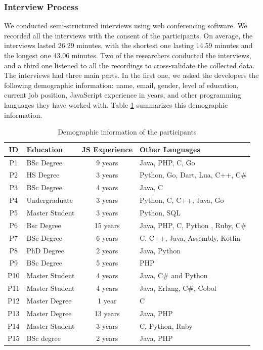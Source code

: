 \subsubsection*{Interview Process} We conducted semi-structured interviews using web conferencing software. We recorded all the interviews with the consent of the participants. On average, the interviews lasted 26.29 minutes, with the shortest one lasting 14.59 minutes and the longest one 43.06 minutes. 
Two of the researchers conducted the interviews, and a third one listened to all the recordings to cross-validate the collected data.
The interviews had three main parts. In the first one, we asked the developers the following demographic information: name, email, gender, level of education, current job position, JavaScript experience in years, and other programming languages they have worked with.
Table \ref{pinterview} summarizes this demographic information.

\begin{table}[htb!]
  \centering
  \caption{Demographic information of the participants}
\begin{scriptsize}  
\begin{tabular}{clcl}
\toprule
ID & Education & JS Experience & Other Languages \\ \midrule 
P1 & BSc Degree & 9 years & Java, PHP, C, Go  
\\ 
P2 & HS Degree & 3 years & Python, Go, Dart, Lua, C++, C\#
\\ 
P3 & BSc Degree & 4 years & Java, C
\\ 
P4 & Undergraduate & 3 years & Python, C, C++, Java, Go
\\ 
P5 & Master Student & 3 years & Python, SQL
\\ 
P6 & Bsc Degree & 15  years  & Java, PHP, C, Python , Ruby, C\#
\\ 
P7 & BSc Degree  & 6 years & C, C++, Java, Assembly, Kotlin
\\ 
P8 & PhD Degree & 2 years & Java, Python
\\ 
P9 & BSc Degree  & 5 years & PHP
\\ 
P10 & Master Student & 4 years & Java, C\# and Python
\\ 
P11 & Master Student & 4 years & Java, Erlang, C\#, Cobol
\\ 
P12 & Master Degree & 1 year & C
\\ 
P13 & Master Degree & 13 years & Java, PHP
\\ 
P14 & Master Student & 3 years & C, Python, Ruby
\\ 
P15 &  BSc degree  & 2 years & Java, PHP
\\ \bottomrule
\end{tabular}
\end{scriptsize}
    \label{pinterview}
\end{table}

